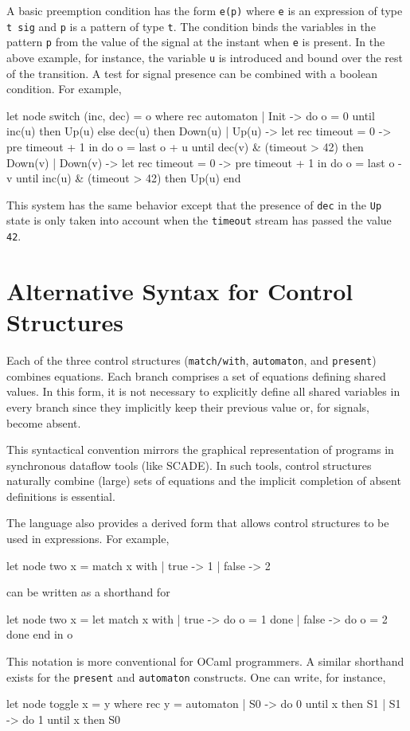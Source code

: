 \documentclass[11pt,titlepage,twoside]{report}
\makeatletter
\newcommand{\zls}[1]{{\@span{class="zelusinline"}#1}}
\newcommand{\zls}[1]{\texttt{#1}}
\renewcommand{\zls}[1]{\texttt{#1}}
\newcommand{\scade}{{\sf SCADE}}
\newcommand{\ocaml}{{\sf OCaml}}
\makeatother
\begin{document}
\newcommand{\Signal}[1]{{#1}\;\mbox{\tt sig}}

A basic preemption condition has the form \zls{e(p)} where \zls{e} is an 
expression of type \zls{t sig} and \zls{p} is a pattern of type \zls{t}.
The condition binds the variables in the pattern \zls{p} from the value of the 
signal at the instant when \zls{e} is present.
In the above example, for instance, the variable \zls{u} is introduced and 
bound over the rest of the transition.
A test for signal presence can be combined with a boolean condition.
For example,
\begin{chklisting}[withresult]
let node switch (inc, dec) = o where
  rec automaton
  | Init ->
      do o = 0
      until inc(u) then Up(u)
       else dec(u) then Down(u)
  | Up(u) ->
      let rec timeout = 0 -> pre timeout + 1 in
      do o = last o + u
      until dec(v) & (timeout > 42) then Down(v)
  | Down(v) ->
      let rec timeout = 0 -> pre timeout + 1 in
      do o = last o - v
      until inc(u) & (timeout > 42) then Up(u)
  end
\end{chklisting}
This system has the same behavior except that the presence of
\zls{dec} in the \zls{Up} state is only taken into account when the
\zls{timeout} stream has passed the value \zls{42}.

\section{Alternative Syntax for Control Structures\label{altcontrol}} %

Each of the three control structures (\zls{match/with},
\zls{automaton}, and \zls{present}) combines equations. Each branch comprises
a set of equations defining shared values. In this form, it
is not necessary to explicitly define all shared variables in every branch
since they implicitly keep their previous value or, for signals, become absent.

This syntactical convention mirrors the graphical representation of programs in 
synchronous dataflow tools (like \scade). In such tools, control structures 
naturally combine (large) sets of equations and the implicit completion of 
absent definitions is essential.

The language also provides a derived form that allows control structures
to be used in expressions. For example,
%
\begin{chklisting}
let node two x =
  match x with | true -> 1 | false -> 2
\end{chklisting}
%
can be written as a shorthand for
\begin{chklisting}
let node two x =
  let match x with
     |  true -> do o = 1 done
     | false -> do o = 2 done
     end in
  o
\end{chklisting}
%
This notation is more conventional for \ocaml{} programmers.
A similar shorthand exists for the \zls{present} and \zls{automaton}
constructs.
One can write, for instance,
\begin{chklisting}
let node toggle x = y where
  rec y =
    automaton
    | S0 -> do 0 until x then S1
    | S1 -> do 1 until x then S0
\end{chklisting}
\end{document}
